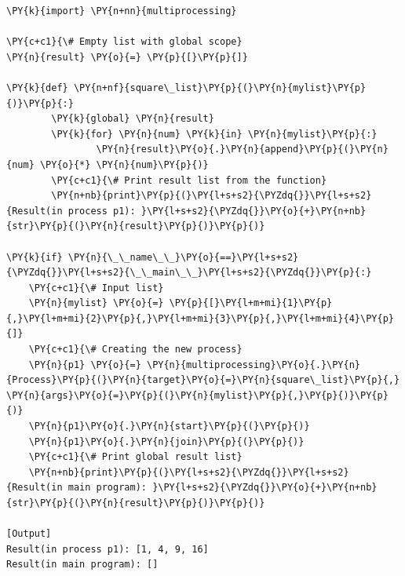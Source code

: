 \begin{Verbatim}[label=\makebox{\url{https://github.com/lucabaldini/cmepda/tree/master/slides/latex/snippets/multiprocessing_global_scope.py}},commandchars=\\\{\}]
\PY{k}{import} \PY{n+nn}{multiprocessing}

\PY{c+c1}{\# Empty list with global scope}
\PY{n}{result} \PY{o}{=} \PY{p}{[}\PY{p}{]}

\PY{k}{def} \PY{n+nf}{square\_list}\PY{p}{(}\PY{n}{mylist}\PY{p}{)}\PY{p}{:}
        \PY{k}{global} \PY{n}{result}
        \PY{k}{for} \PY{n}{num} \PY{k}{in} \PY{n}{mylist}\PY{p}{:}
                \PY{n}{result}\PY{o}{.}\PY{n}{append}\PY{p}{(}\PY{n}{num} \PY{o}{*} \PY{n}{num}\PY{p}{)}
        \PY{c+c1}{\# Print result list from the function}
        \PY{n+nb}{print}\PY{p}{(}\PY{l+s+s2}{\PYZdq{}}\PY{l+s+s2}{Result(in process p1): }\PY{l+s+s2}{\PYZdq{}}\PY{o}{+}\PY{n+nb}{str}\PY{p}{(}\PY{n}{result}\PY{p}{)}\PY{p}{)}

\PY{k}{if} \PY{n}{\_\_name\_\_}\PY{o}{==}\PY{l+s+s2}{\PYZdq{}}\PY{l+s+s2}{\_\_main\_\_}\PY{l+s+s2}{\PYZdq{}}\PY{p}{:}
    \PY{c+c1}{\# Input list}
    \PY{n}{mylist} \PY{o}{=} \PY{p}{[}\PY{l+m+mi}{1}\PY{p}{,}\PY{l+m+mi}{2}\PY{p}{,}\PY{l+m+mi}{3}\PY{p}{,}\PY{l+m+mi}{4}\PY{p}{]}
    \PY{c+c1}{\# Creating the new process}
    \PY{n}{p1} \PY{o}{=} \PY{n}{multiprocessing}\PY{o}{.}\PY{n}{Process}\PY{p}{(}\PY{n}{target}\PY{o}{=}\PY{n}{square\_list}\PY{p}{,} \PY{n}{args}\PY{o}{=}\PY{p}{(}\PY{n}{mylist}\PY{p}{,}\PY{p}{)}\PY{p}{)}
    \PY{n}{p1}\PY{o}{.}\PY{n}{start}\PY{p}{(}\PY{p}{)}
    \PY{n}{p1}\PY{o}{.}\PY{n}{join}\PY{p}{(}\PY{p}{)}
    \PY{c+c1}{\# Print global result list}
    \PY{n+nb}{print}\PY{p}{(}\PY{l+s+s2}{\PYZdq{}}\PY{l+s+s2}{Result(in main program): }\PY{l+s+s2}{\PYZdq{}}\PY{o}{+}\PY{n+nb}{str}\PY{p}{(}\PY{n}{result}\PY{p}{)}\PY{p}{)}

[Output]
Result(in process p1): [1, 4, 9, 16]
Result(in main program): []
\end{Verbatim}